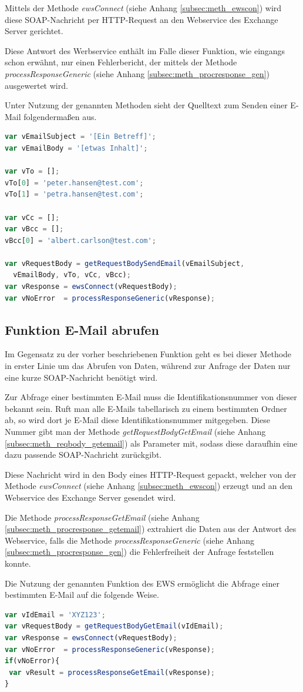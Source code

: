 Mittels der Methode \emph{ewsConnect} (siehe Anhang \ref{subsec:meth_ewscon}) wird diese SOAP-Nachricht per HTTP-Request an den Webservice des Exchange Server gerichtet. 

Diese Antwort des Werbservice enthält im Falle dieser Funktion, wie eingangs schon erwähnt, nur einen Fehlerbericht, der mittels der Methode \emph{processResponseGeneric} (siehe Anhang \ref{subsec:meth_procresponse_gen}) ausgewertet wird.

Unter Nutzung der genannten Methoden sieht der Quelltext zum Senden einer E-Mail folgendermaßen aus.

\begin{lstlisting}[language=JavaScript]
var vEmailSubject = '[Ein Betreff]';
var vEmailBody = '[etwas Inhalt]';

var vTo = [];
vTo[0] = 'peter.hansen@test.com';
vTo[1] = 'petra.hansen@test.com';

var vCc = [];
var vBcc = [];
vBcc[0] = 'albert.carlson@test.com';

var vRequestBody = getRequestBodySendEmail(vEmailSubject,
  vEmailBody, vTo, vCc, vBcc);
var vResponse = ewsConnect(vRequestBody);
var vNoError  = processResponseGeneric(vResponse);
\end{lstlisting}

\subsection{Funktion E-Mail abrufen}
Im Gegensatz zu der vorher beschriebenen Funktion geht es bei dieser Methode in erster Linie um das Abrufen von Daten, während zur Anfrage der Daten nur eine kurze SOAP-Nachricht benötigt wird.

Zur Abfrage einer bestimmten E-Mail muss die Identifikationsnummer von dieser bekannt sein. Ruft man alle E-Mails tabellarisch zu einem bestimmten Ordner ab, so wird dort je E-Mail diese Identifikationsnummer mitgegeben. Diese Nummer gibt man der Methode \emph{getRequestBodyGetEmail} (siehe Anhang \ref{subsec:meth_reqbody_getemail}) als Parameter mit, sodass diese daraufhin eine dazu passende SOAP-Nachricht zurückgibt.

Diese Nachricht wird in den Body eines HTTP-Request gepackt, welcher von der Methode \emph{ewsConnect} (siehe Anhang \ref{subsec:meth_ewscon}) erzeugt und an den Webservice des Exchange Server gesendet wird.

Die Methode \emph{processResponseGetEmail} (siehe Anhang \ref{subsec:meth_procresponse_getemail}) extrahiert die Daten aus der Antwort des Webservice, falls die Methode \emph{processResponseGeneric} (siehe Anhang \ref{subsec:meth_procresponse_gen}) die Fehlerfreiheit der Anfrage feststellen konnte.

Die Nutzung der genannten Funktion des \ac{EWS} ermöglicht die Abfrage einer bestimmten E-Mail auf die folgende Weise.

\begin{lstlisting}[language=JavaScript]
var vIdEmail = 'XYZ123';
var vRequestBody = getRequestBodyGetEmail(vIdEmail);
var vResponse = ewsConnect(vRequestBody);
var vNoError  = processResponseGeneric(vResponse);
if(vNoError){
 var vResult = processResponseGetEmail(vResponse);
}
\end{lstlisting} 